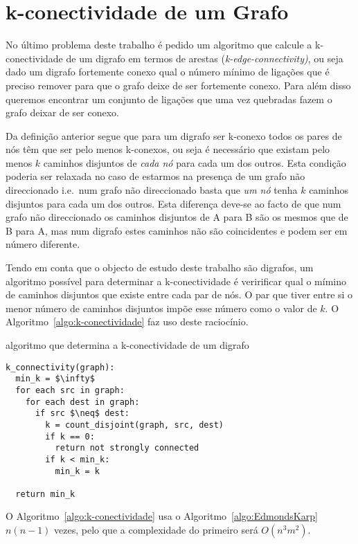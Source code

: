 \documentclass[10pt,a4paper]{article}
\begin{document}
\section{k-conectividade de um Grafo}
No último problema deste trabalho é pedido um algoritmo que calcule a k-conectividade de um digrafo em termos de arestas (\textit{k-edge-connectivity)}, ou seja dado um digrafo fortemente conexo qual o número mínimo de ligações que é preciso remover para que o grafo deixe de ser fortemente conexo. Para além disso queremos encontrar um conjunto de ligações que uma vez quebradas fazem o grafo deixar de ser conexo.

Da definição anterior segue que para um digrafo ser k-conexo todos os pares de nós têm que ser pelo menos k-conexos, ou seja é necessário que existam pelo menos $k$ caminhos disjuntos de \emph{cada nó} para cada um dos outros. Esta condição poderia ser relaxada no caso de estarmos na presença de um grafo não direccionado i.e.\ num grafo não direccionado basta que \emph{um nó} tenha $k$ caminhos disjuntos para cada um dos outros. Esta diferença deve-se ao facto de que num grafo não direccionado os caminhos disjuntos de A para B são os mesmos que de B para A, mas num digrafo estes caminhos não são coincidentes e podem ser em número diferente.

Tendo em conta que o objecto de estudo deste trabalho são digrafos, um algoritmo possível para determinar a k-conectividade é veririficar qual o mímino de caminhos disjuntos que existe entre cada par de nós. O par que tiver entre si o menor número de caminhos disjuntos impõe esse número como o valor de $k$. O Algoritmo~\ref{algo:k-conectividade} faz uso deste raciocínio.

\begin{algorithm}[h]
\caption{algoritmo que determina a k-conectividade de um digrafo}
\label{algo:k-conectividade}
\begin{lstlisting}[linewidth=0.95\linewidth, mathescape]
k_connectivity(graph):
  min_k = $\infty$
  for each src in graph:
    for each dest in graph:
      if src $\neq$ dest:
        k = count_disjoint(graph, src, dest)
        if k == 0:
          return not strongly connected
        if k < min_k:
          min_k = k

  return min_k
\end{lstlisting}
\end{algorithm}

O Algoritmo~\ref{algo:k-conectividade} usa o Algoritmo~\ref{algo:EdmondsKarp} $n(n-1)$ vezes, pelo que a complexidade do primeiro será $O(n^3 m^2)$.
\end{document}
